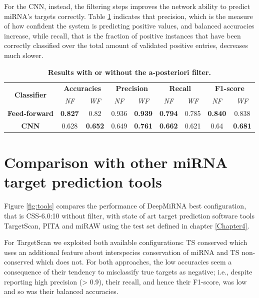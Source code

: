 For the CNN, instead, the filtering steps improves the network ability to predict miRNA's targets correctly. Table \ref{tab:sa_filter} indicates that precision, which is the measure of how confident the system is predicting positive values, and balanced accuracies increase, while recall, that is the fraction of positive instances that have been correctly classified over the total amount of validated positive entries, decreases much slower. 

\begin{table}[h!]
	\caption{\textbf{Results with or without the a-posteriori filter.}}
	\label{tab:sa_filter}
	\centering
	\begin{tabular}{| c | c | c | c | c | c | c | c | c |}
		\hline
		\multirow{2}{4.5em}{\textbf{Classifier}} & \multicolumn{2}{c|}{\textbf{Accuracies}} & \multicolumn{2}{c|}{\textbf{Precision}} & \multicolumn{2}{c|}{\textbf{Recall}} & \multicolumn{2}{c|}{\textbf{F1-score}} \\ 
		\cline{2-9}
		& \emph{NF} & \emph{WF} & \emph{NF} & \emph{WF} & \emph{NF} & \emph{WF} & \emph{NF} & \emph{WF} \\ 
		\hline
		\textbf{Feed-forward} & \textbf{0.827} & 0.82 & 0.936 & \textbf{0.939} & \textbf{0.794} & 0.785 & \textbf{0.840} & 0.838 \\ 
		\hline
		\textbf{CNN} & 0.628 & \textbf{0.652} & 0.649 & \textbf{0.761} & \textbf{0.662} & 0.621 & 0.64 & \textbf{0.681} \\ 
		\hline 
	\end{tabular}
\end{table}

\section{Comparison with other miRNA target prediction tools}

Figure \ref{fig:tools} compares the performance of DeepMiRNA best configuration, that is CSS-6.0:10 without filter, with state of art target prediction software tools TargetScan, PITA and miRAW using the test set defined in chapter \ref{Chapter4}.

For TargetScan we exploited both available configurations: TS conserved which uses an additional feature about interspecies conservation of miRNA and TS non-conserved which does not. For both approaches, the low accuracies seem a consequence of their tendency to misclassify true targets as negative; i.e., despite reporting high precision (> 0.9),
their recall, and hence their F1-score, was low and so was their balanced accuracies.

